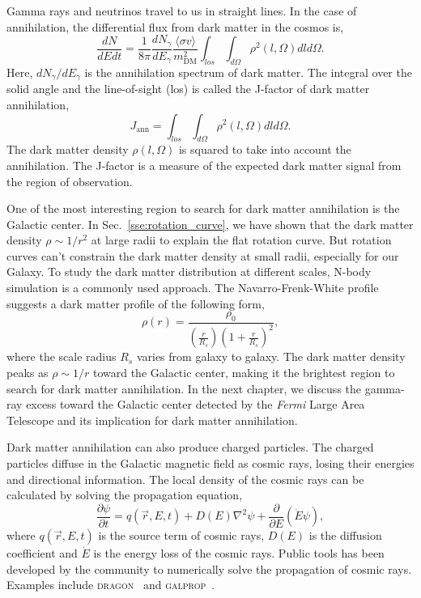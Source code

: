 \documentclass[doublespace,nopageskip]{VTthesis} %
\newcommand{\sigmav}{\langle\sigma v\rangle}
\begin{document}
Gamma rays and neutrinos travel to us in straight lines. In the case of annihilation, the differential flux from dark matter in the cosmos is,
\begin{equation}\label{eq:ann}
    \frac{dN}{dEdt} = \frac{1}{8\pi}\frac{dN_\gamma}{dE_\gamma}\frac{\sigmav}{m_\mathrm{DM}^2}\int_{los}\int_{d\Omega}\rho^2(l,\Omega)dld\Omega.
\end{equation}
Here, $dN_\gamma/dE_\gamma$ is the annihilation spectrum of dark matter. The integral over the solid angle and the line-of-sight (los) is called the J-factor of dark matter annihilation,
\begin{equation}
    J_\mathrm{ann} = \int_{los}\int_{d\Omega}\rho^2(l,\Omega)dld\Omega.
\end{equation}
The dark matter density $\rho(l,\Omega)$ is squared to take into account the annihilation. The J-factor is a measure of the expected dark matter signal from the region of observation.

One of the most interesting region to search for dark matter annihilation is the Galactic center. In Sec.~\ref{sse:rotation_curve}, we have shown that the dark matter density $\rho \sim 1/r^2$ at large radii to explain the flat rotation curve. But rotation curves can't constrain the dark matter density at small radii, especially for our Galaxy. To study the dark matter distribution at different scales, N-body simulation is a commonly used approach. The Navarro-Frenk-White profile~\cite{1996ApJ...462..563N} suggests a dark matter profile of the following form,
\begin{equation}
    \rho(r) = \frac{\rho_0}{(\frac{r}{R_s})(1+\frac{r}{R_s})^2},
\end{equation}
where the scale radius $R_s$ varies from galaxy to galaxy. The dark matter density peaks as $\rho \sim 1/r$ toward the Galactic center, making it the brightest region to search for dark matter annihilation. In the next chapter, we discuss the gamma-ray excess toward the Galactic center detected by the \textit{Fermi} Large Area Telescope and its implication for dark matter annihilation.

Dark matter annihilation can also produce charged particles. The charged particles diffuse in the Galactic magnetic field as cosmic rays, losing their energies and directional information. The local density of the cosmic rays can be calculated by solving the propagation equation,
\begin{equation}
    \frac{\partial\psi}{\partial t} = q(\vec{r},E,t) + D(E)\nabla^2\psi + \frac{\partial}{\partial E}(\dot{E}\psi),
\end{equation}
where $q(\vec{r},E,t)$ is the source term of cosmic rays, $D(E)$ is the diffusion coefficient and $\dot{E}$ is the energy loss of the cosmic rays. Public tools has been developed by the community to numerically solve the propagation of cosmic rays. Examples include \textsc{dragon}~\cite{2010APh....34..274D} and \textsc{galprop}~\cite{1998ApJ...509..212S}.
\end{document}
